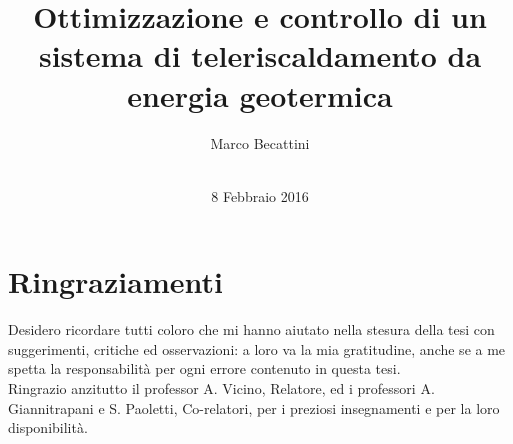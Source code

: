\documentclass[laurea,oneside,11pt]{USiena_tesiLM}
\title{Ottimizzazione e controllo di un sistema di teleriscaldamento da energia geotermica}
\author{Marco Becattini\\~\\}
\date{8 Febbraio 2016}
\newcommand{\facciatabianca}{\newpage\shipout\null\stepcounter{page}}
\begin{document}
\maketitle

\facciatabianca


%
%
  

\frontmatter
\chapter*{Ringraziamenti}

Desidero ricordare tutti coloro che mi hanno aiutato nella stesura della tesi con suggerimenti, critiche ed osservazioni: a loro va la mia gratitudine, anche se a me spetta la responsabilità per ogni errore contenuto in questa tesi.\\

Ringrazio anzitutto il  professor A. Vicino, Relatore,  ed i professori A. Giannitrapani e S. Paoletti,  Co-relatori, per i  preziosi insegnamenti e per la loro disponibilità. \\
\end{document}
